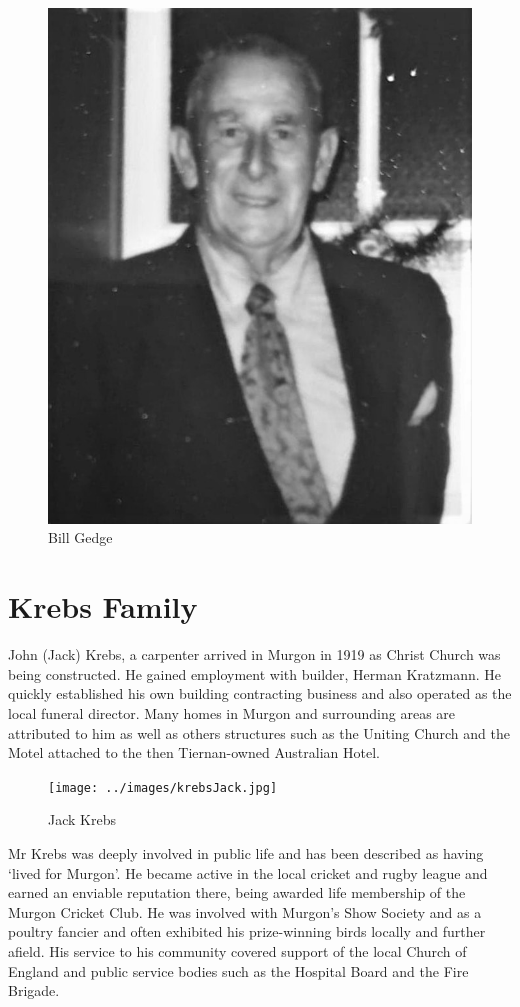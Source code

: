\begin{figure}
\begin{center}
\includegraphics[width=.6\linewidth,center]{../images/BillGedge.jpg}
\caption{Bill Gedge}
\end{center}
\end{figure}




\section{Krebs Family}



John (Jack) Krebs, a carpenter arrived in Murgon in 1919 as Christ Church was being constructed. He gained employment with builder, Herman Kratzmann. He quickly established his own building contracting business and also operated as the local funeral director. Many homes in Murgon and surrounding areas are attributed to him as well as others structures such as the Uniting Church and the Motel attached to the then Tiernan-owned Australian Hotel.









\begin{figure}
\begin{center}
\texttt{[image: ../images/krebsJack.jpg]}
\caption{Jack Krebs}
\end{center}
\end{figure}




Mr Krebs was deeply involved in public life and has been described as having `lived for Murgon'. He became active in the local cricket and rugby league and earned an enviable reputation there, being awarded life membership of the Murgon Cricket Club. He was involved with Murgon's Show Society and as a poultry fancier and often exhibited his prize-winning birds locally and further afield. His service to his community covered support of the local Church of England and public service bodies such as the Hospital Board and the Fire Brigade.



